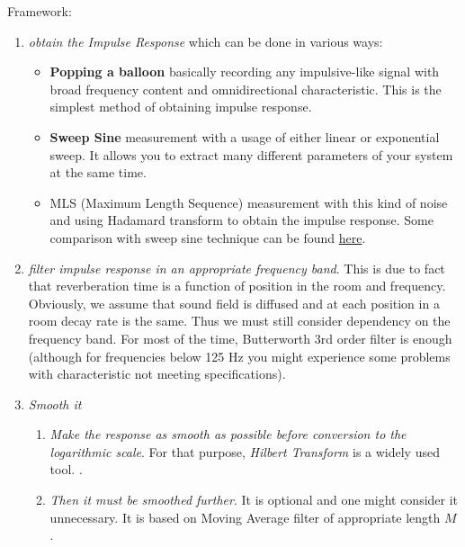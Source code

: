 Framework:
\begin{enumerate}
    \item \textit{obtain the Impulse Response} which can be done in various ways:
    \begin{itemize}
        \item \textbf{Popping a balloon} basically recording
        any impulsive-like signal with broad frequency content
        and omnidirectional characteristic.
        This is the simplest method of obtaining impulse response.
        \item \textbf{Sweep Sine} measurement with a usage of either linear
        or exponential sweep. It allows you to extract many different
        parameters of your system at the same time.
        \item MLS (Maximum Length Sequence) measurement
        with this kind of noise and using Hadamard transform
        to obtain the impulse response.
        Some comparison with sweep sine technique can be found
        \href{https://ev.fe.uni-lj.si/3-2011/Policardi.pdf}{here}.
    \end{itemize}

    \item \textit{filter impulse response in an appropriate frequency band}.
    This is due to fact that reverberation time is a function of position
    in the room and frequency. Obviously, we assume that sound field is
    diffused and at each position in a room decay rate is the same.
    Thus we must still consider dependency on the frequency band.
    For most of the time, Butterworth 3rd order filter is enough
    (although for frequencies below 125 Hz you might experience some problems
    with characteristic not meeting specifications).

    \item \textit{Smooth it}
    \begin{enumerate}
        \item \textit{Make the response as smooth as possible before conversion
        to the logarithmic scale}.
        For that purpose, \textit{Hilbert Transform} is a widely used tool.
        .

        \item \textit{Then it must be smoothed further}. It is optional and one might consider it unnecessary.
        It is based on Moving Average filter of appropriate length $M$ .


\end{enumerate}
\end{enumerate}
